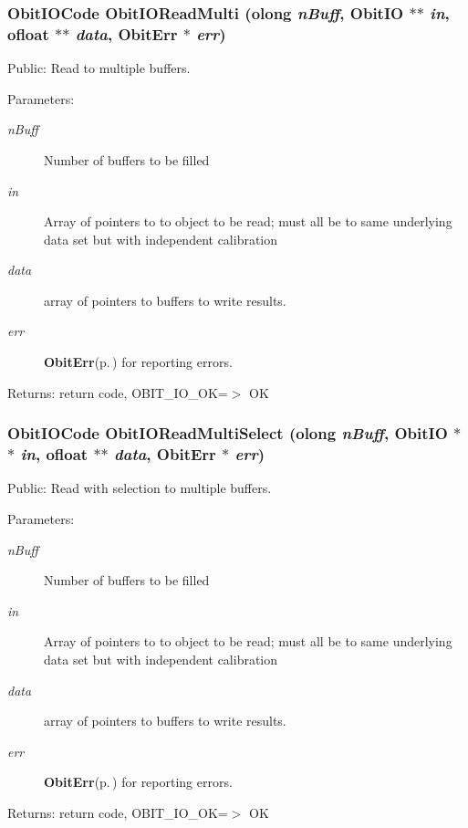 \subsubsection{\setlength{\rightskip}{0pt plus 5cm}Obit\-IOCode Obit\-IORead\-Multi ({\bf olong} {\em n\-Buff}, {\bf Obit\-IO} $\ast$$\ast$ {\em in}, {\bf ofloat} $\ast$$\ast$ {\em data}, {\bf Obit\-Err} $\ast$ {\em err})}\label{ObitIO_8c_a16}


Public: Read to multiple buffers. 

\begin{Desc}
\item[Parameters:]
\begin{description}
\item[{\em n\-Buff}]Number of buffers to be filled \item[{\em in}]Array of pointers to to object to be read; must all be to same underlying data set but with independent calibration \item[{\em data}]array of pointers to buffers to write results. \item[{\em err}]{\bf Obit\-Err}{\rm (p.\,\pageref{structObitErr})} for reporting errors. \end{description}
\end{Desc}
\begin{Desc}
\item[Returns:]return code, OBIT\_\-IO\_\-OK=$>$ OK \end{Desc}
\subsubsection{\setlength{\rightskip}{0pt plus 5cm}Obit\-IOCode Obit\-IORead\-Multi\-Select ({\bf olong} {\em n\-Buff}, {\bf Obit\-IO} $\ast$$\ast$ {\em in}, {\bf ofloat} $\ast$$\ast$ {\em data}, {\bf Obit\-Err} $\ast$ {\em err})}\label{ObitIO_8c_a20}


Public: Read with selection to multiple buffers. 

\begin{Desc}
\item[Parameters:]
\begin{description}
\item[{\em n\-Buff}]Number of buffers to be filled \item[{\em in}]Array of pointers to to object to be read; must all be to same underlying data set but with independent calibration \item[{\em data}]array of pointers to buffers to write results. \item[{\em err}]{\bf Obit\-Err}{\rm (p.\,\pageref{structObitErr})} for reporting errors. \end{description}
\end{Desc}
\begin{Desc}
\item[Returns:]return code, OBIT\_\-IO\_\-OK=$>$ OK \end{Desc}
